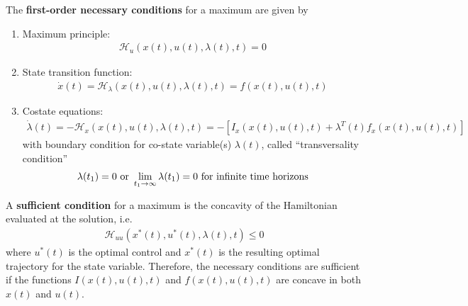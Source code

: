 \documentclass[11pt]{elegantbook}
\begin{document}
\begin{proposition}\label{prop:Hamiltonian_FOC}
    The \textbf{first-order necessary conditions} for a maximum are given by
    \begin{enumerate}
        \item Maximum principle:
        \begin{equation}
            \begin{aligned}
                \mathcal{H}_u(x(t),u(t),\lambda(t),t)=0
            \end{aligned}
            \nonumber
        \end{equation}
        \item State transition function:
        \begin{equation}
            \begin{aligned}
                \dot{x}(t)=\mathcal{H}_\lambda(x(t),u(t),\lambda(t),t)=f(x(t),u(t),t)
            \end{aligned}
            \nonumber
        \end{equation}
        \item Costate equations:
        \begin{equation}
            \begin{aligned}
                \dot{\lambda}(t)=-\mathcal{H}_x(x(t),u(t),\lambda(t),t)=-[I_x(x(t),u(t),t)+\lambda^T(t)f_x(x(t),u(t),t)]
            \end{aligned}
            \nonumber
        \end{equation}
        with boundary condition for co-state variable(s) $\lambda(t)$, called
        “transversality condition”
        \begin{equation}
            \begin{aligned}
                \lambda(t_1)=0 \textnormal{ or }\lim_{t_1 \rightarrow \infty}\lambda(t_1)=0 \textnormal{ for infinite time horizons}
            \end{aligned}
            \nonumber
        \end{equation}
    \end{enumerate}
    A \textbf{sufficient condition} for a maximum is the concavity of the Hamiltonian evaluated at the solution, i.e.
    \begin{equation}
        \begin{aligned}
            \mathcal{H}_{uu}\left(x^*(t),u^*(t),\lambda(t),t\right)\leq 0
        \end{aligned}
        \nonumber
    \end{equation}
    where $u^*(t)$ is the optimal control and $x^*(t)$ is the resulting optimal trajectory for the state variable. Therefore, the necessary conditions are sufficient if the functions $I(x(t),u(t),t)$ and $f(x(t),u(t),t)$ are concave in both $x(t)$ and $u(t)$.
\end{proposition}
\end{document}
